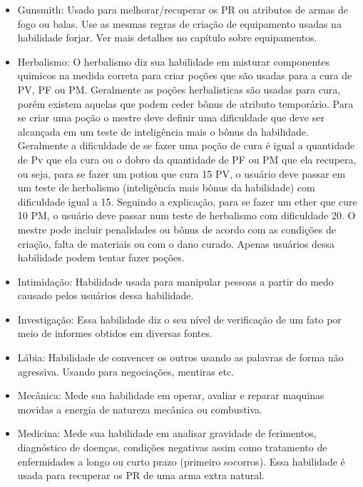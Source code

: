 \begin{itemize}
	\item Gunsmith:	Usado para melhorar/recuperar os PR ou atributos de armas de fogo ou balas. Use as mesmas regras de criação de equipamento usadas na habilidade forjar. Ver mais detalhes no capítulo sobre equipamentos.
	
	\item Herbalismo: O herbalismo diz sua habilidade em misturar componentes quimicos na medida correta para criar poções que são usadas para a cura de PV, PF ou PM. Geralmente as poções herbalisticas são usadas para cura, porém existem aquelas que podem ceder bônus de atributo temporário. Para se criar uma poção o mestre deve definir uma dificuldade que deve ser alcançada em um teste de inteligência mais o bônus da habilidade. Geralmente a dificuldade de se fazer uma poção de cura é igual a quantidade de Pv que ela cura ou o dobro da quantidade de PF ou PM que ela recupera, ou seja, para se fazer um potion que cura 15 PV, o usuário deve passar em um teste de herbalismo (inteligência mais bônus da habilidade) com dificuldade igual a 15. Seguindo a explicação, para se fazer um ether que cure 10 PM, o usuário deve passar num teste de herbalismo com dificuldade 20. O mestre pode incluir penalidades ou bônus de acordo com as condições de criação, falta de materiais ou com o dano curado. Apenas usuários dessa habilidade podem tentar fazer poções.  		

	\item Intimidação: Habilidade usada para manipular pessoas a partir do medo causado pelos usuários dessa habilidade.	
	
	\item Investigação: Essa habilidade diz o seu nível de verificação de um fato por meio de informes obtidos em diversas fontes.	
	
	\item Lábia: Habilidade de convencer os outros usando as palavras de forma não agressiva. Usando para negociações, mentiras etc.  
	
	\item Mecânica: Mede sua habilidade em operar, avaliar e reparar maquinas movidas a energia de natureza mecânica ou combustiva.
	
	\item Medicina: Mede sua habilidade em analisar gravidade de ferimentos, diagnóstico de doenças, condições negativas assim como tratamento de enfermidades a longo ou curto prazo (primeiro socorros). Essa habilidade é usada para recuperar os PR de uma arma extra natural.
	

\end{itemize}
